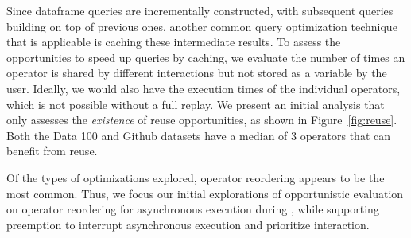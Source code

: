 Since dataframe queries are incrementally constructed, with subsequent queries building on top of previous ones, another common query optimization technique that is applicable is caching these intermediate results.
To assess the opportunities to speed up queries by caching, we evaluate the number of times an operator is shared by different interactions but not stored as a variable by the user.
Ideally, we would also have the execution times of the individual operators, which is not possible without a full replay.  We present an initial analysis that only assesses the \emph{existence} of reuse opportunities, as shown
in Figure~\ref{fig:reuse}. Both the Data 100 and Github datasets have a median of 3 operators that can benefit from reuse.


\vspace{2pt}
\noindent Of the types of optimizations explored, operator reordering appears to be the most common.
Thus, we focus our initial explorations of opportunistic evaluation on operator reordering for asynchronous execution during \thinktime, while supporting preemption to interrupt asynchronous execution and prioritize interaction.
